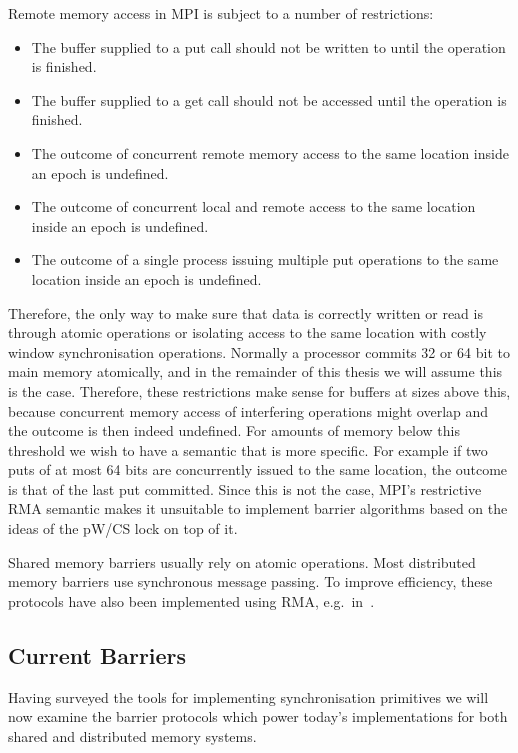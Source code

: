 \documentclass[a4paper, 10pt]{article}
\begin{document}
Remote memory access in MPI is subject to a number of restrictions:
\begin{itemize}
	\item The buffer supplied to a put call should not be written to until the operation is finished.
	\item The buffer supplied to a get call should not be accessed until the operation is finished.
	\item The outcome of concurrent remote memory access to the same location inside an epoch is undefined.
	\item The outcome of concurrent local and remote access to the same location inside an epoch is undefined.
	\item The outcome of a single process issuing multiple put operations to the same location inside an epoch is undefined.
\end{itemize}
Therefore, the only way to make sure that data is correctly written or read is through atomic operations or isolating access to the same location with costly window synchronisation operations.
Normally a processor commits 32 or 64 bit to main memory atomically, and in the remainder of this thesis we will assume this is the case.
Therefore, these restrictions make sense for buffers at sizes above this, because concurrent memory access of interfering operations might overlap and the outcome is then indeed undefined.
For amounts of memory below this threshold we wish to have a semantic that is more specific. For example if two puts of at most 64 bits are concurrently issued to the same location, the outcome is that of the last put committed. Since this is not the case, MPI's restrictive RMA semantic makes it unsuitable to implement barrier algorithms based on the ideas of the pW/CS lock on top of it.

Shared memory barriers usually rely on atomic operations. Most distributed memory barriers use synchronous message passing. To improve efficiency, these protocols have also been implemented using RMA, e.g.~in~\cite{rdma1,rdma2,hoefler2006a}.

\subsection{Current Barriers}
\label{ssec:background-current}
Having surveyed the tools for implementing synchronisation primitives we will now examine the barrier protocols which power today's implementations for both shared and distributed memory systems.
\end{document}
